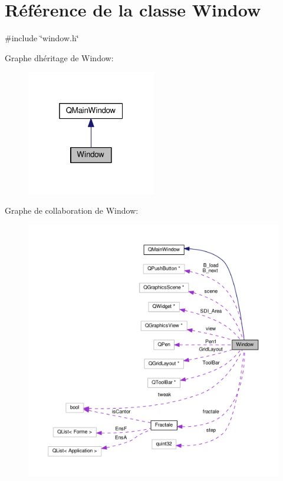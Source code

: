 \hypertarget{class_window}{}\section{Référence de la classe Window}
\label{class_window}


{\ttfamily \#include \char`\"{}window.\+h\char`\"{}}



Graphe d\textquotesingle{}héritage de Window\+:\nopagebreak
\begin{figure}[H]
\begin{center}
\leavevmode
\includegraphics[width=160pt]{class_window__inherit__graph}
\end{center}
\end{figure}


Graphe de collaboration de Window\+:\nopagebreak
\begin{figure}[H]
\begin{center}
\leavevmode
\includegraphics[width=350pt]{class_window__coll__graph}
\end{center}
\end{figure}
